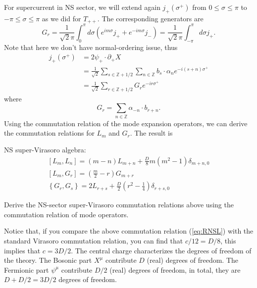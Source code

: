\documentclass[graybox,envcountchap,sectrefs]{svmono}
\begin{document}
For supercurrent in NS sector, we will extend again $j_{+}\left(\sigma^{+}\right)$ from $0 \leq \sigma \leq \pi$ to $-\pi \leq \sigma \leq \pi$ as we did for $T_{++}$. The corresponding generators are
\begin{equation}
G_r=\frac{1}{\sqrt{2}\pi}\int_{0}^{\pi}d\sigma \left( e^{im\sigma}j_{+}+e^{-im\sigma}j_{-}\right)=\frac{1}{\sqrt{2}\pi}\int_{-\pi}^{\pi}d\sigma j_{+}.
\end{equation}
Note that here we don't have normal-ordering issue, thus
\begin{equation}
\begin{aligned}
j_{+}\left(\sigma^{+}\right) &=2 \psi_{+} \cdot \partial_{+} X \\
&=\frac{1}{\sqrt{2}} \sum_{s \in \mathbb{Z}+1 / 2} \sum_{n \in \mathbb{Z}} b_{s} \cdot \alpha_{n} e^{-i(s+n) \sigma^{+}} \\
&=\frac{1}{\sqrt{2}} \sum_{r \in \mathbb{Z}+1 / 2} G_{r} e^{-i r \sigma^{+}}
\end{aligned}
\end{equation}
where
\begin{equation}
G_{r}=\sum_{n \in \mathbb{Z}} \alpha_{-n} \cdot b_{r+n}.
\end{equation}
Using the commutation relation of the mode expansion operators, we can derive the commutation relations for $L_m$ and $G_r$. The result is
\begin{svgraybox}
NS super-Virasoro algebra:
\begin{align}
{\left[L_{m}, L_{n}\right]=(m-n) L_{m+n}+\frac{D}{8} m\left(m^{2}-1\right) \delta_{m+n, 0}}\label{eq:RNSL} \\
{\left[L_{m}, G_{r}\right]=\left(\frac{m}{2}-r\right) G_{m+r}} \\
\left\{G_{r}, G_{s}\right\}=2 L_{r+s}+\frac{D}{2}\left(r^{2}-\frac{1}{4}\right) \delta_{r+s, 0}
\end{align}	
\end{svgraybox}
\begin{exercise}
Derive the NS-sector super-Virasoro commutation relations above using the commutation relation of mode operators.
\end{exercise}
Notice that, if you compare the above commutation relation (\ref{eq:RNSL}) with the standard Virasoro commutation relation, you can find that $c/12=D/8$, this implies that $c=3D/2$. The central charge characterizes the degrees of freedom of the theory. The Bosonic part $X^{\mu}$ contribute $D$ (real) degrees of freedom. The Fermionic part $\psi^{\mu}$ contribute $D/2$ (real) degrees of freedom, in total, they are $D+D/2=3D/2$ degrees of freedom.
\end{document}
